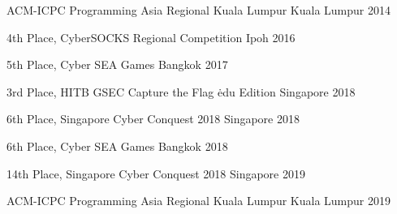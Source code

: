 



\begin{cvhonors}

  \cvhonor
    {}
    {ACM-ICPC Programming Asia Regional Kuala Lumpur} 
    {Kuala Lumpur} 
    {2014} 

  \cvhonor
    {4th Place,} 
    {CyberSOCKS Regional Competition} 
    {Ipoh} 
    {2016} 

  \cvhonor
    {5th Place,} 
    {Cyber SEA Games} 
    {Bangkok} 
    {2017} 

  \cvhonor
    {3rd Place,} 
    {HITB GSEC Capture the Flag \.edu Edition} 
    {Singapore} 
    {2018} 

  \cvhonor
    {6th Place,} 
    {Singapore Cyber Conquest 2018} 
    {Singapore} 
    {2018} 

  \cvhonor
  {6th Place,} 
  {Cyber SEA Games} 
  {Bangkok} 
  {2018} 

  \cvhonor
  {14th Place,} 
  {Singapore Cyber Conquest 2018} 
  {Singapore} 
  {2019} 

  \cvhonor
  {} 
  {ACM-ICPC Programming Asia Regional Kuala Lumpur} 
  {Kuala Lumpur} 
  {2019} 

\end{cvhonors}




